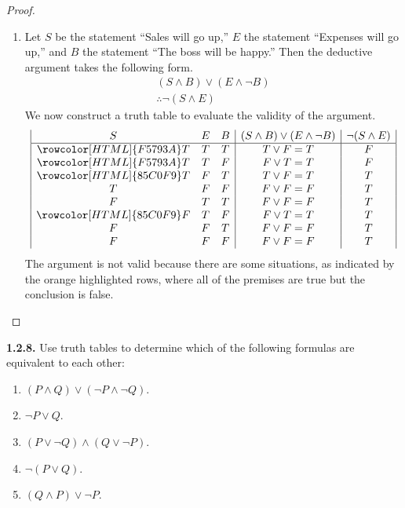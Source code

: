 \documentclass[12pt]{amsart}
\newenvironment{statement}[1]{\smallskip\noindent\color[rgb]{.6627, .3529, .6314} {\bf #1.}}{}
\theoremstyle{definition}
\theoremstyle{remark}
\begin{document}
\begin{proof}
\begin{enumerate}
	\item Let $S$ be the statement ``Sales will go up,'' $E$ the statement ``Expenses will go up,'' and $B$ the statement ``The boss will be happy.''
	Then the deductive argument takes the following form.
	\begin{equation*}
		\begin{array}{l}
			(S \wedge B) \vee (E \wedge \neg B) \\
			\hline
			\therefore \neg (S \wedge E)
		\end{array}
	\end{equation*}
	We now construct a truth table to evaluate the validity of the argument.
	\begin{equation*}
		\begin{array}{| c c c | c | c |}
			S & E & B & (S \wedge B) \vee (E \wedge \neg B) & \neg (S \wedge E) \\
			\hline
			\rowcolor[HTML]{F5793A} T & T & T & T \vee F = T & F \\
			\rowcolor[HTML]{F5793A} T & T & F & F \vee T = T & F \\
			\rowcolor[HTML]{85C0F9} T & F & T & T \vee F = T & T \\
			T & F & F & F \vee F = F & T \\
			F & T & T & F \vee F = F & T\\
			\rowcolor[HTML]{85C0F9} F & T & F & F \vee T = T & T \\
			F & F & T & F \vee F = F & T \\
			F & F & F & F \vee F = F & T
		\end{array}
	\end{equation*}
	The argument is not valid because there are some situations, as indicated by the orange highlighted rows, where all of the premises are true but the conclusion is false.
\end{enumerate}
\end{proof}


\begin{statement}{1.2.8}
Use truth tables to determine which of the following formulas are equivalent to each other:
\begin{enumerate}
	\item $(P \wedge Q) \vee (\neg P \wedge \neg Q)$.
	\item $\neg P \vee Q$.
	\item $(P \vee \neg Q) \wedge (Q \vee \neg P)$.
	\item $\neg (P \vee Q)$.
	\item $(Q \wedge P) \vee \neg P$.
\end{enumerate}
\end{statement}
\end{document}
